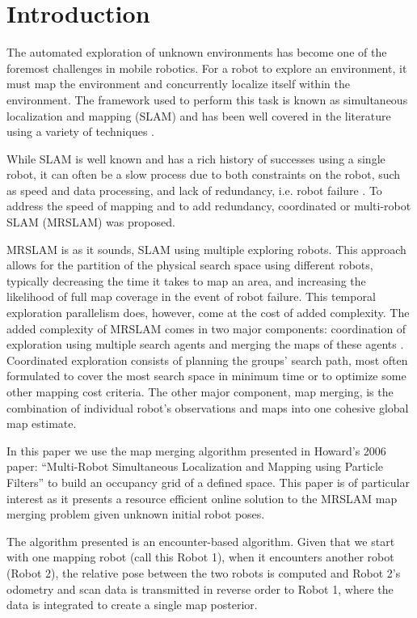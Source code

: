 \section{Introduction}
\label{S:Intro}


The automated exploration of unknown environments has become one of the foremost challenges in mobile robotics. For a robot to explore an environment, it must map the environment and concurrently localize itself within the environment.  The framework used to perform this task is known as simultaneous localization and mapping (SLAM) and has been well covered in the literature using a variety of techniques \cite{durrant2006simultaneous,bailey2006simultaneous}.

While SLAM is well known and has a rich history of successes using a single robot, it can often be a slow process due to both constraints on the robot, such as speed and data processing, and lack of redundancy, i.e. robot failure \cite{thrun2001probabilistic,burgard2005coordinated}.  To address the speed of mapping and to add redundancy, coordinated or multi-robot SLAM (MRSLAM) was proposed.

MRSLAM is as it sounds, SLAM using multiple exploring robots. This approach allows for the partition of the physical search space using different robots, typically decreasing the time it takes to map an area, and increasing the likelihood of full map coverage in the event of robot failure. This temporal exploration parallelism does, however, come at the cost of added complexity. The added complexity of MRSLAM comes in two major components: coordination of exploration using multiple search agents and merging the maps of these agents \cite{fox2006distributed}.  Coordinated exploration consists of planning the groups' search path, most often formulated to cover the most search space in minimum time or to optimize some other mapping cost criteria. The other major component, map merging, is the combination of individual robot's observations and maps into one cohesive global map estimate.

In this paper we use the map merging algorithm presented in Howard's 2006 paper: ``Multi-Robot Simultaneous Localization and Mapping using Particle Filters'' \cite{howard2006multi} to build an occupancy grid of a defined space. This paper is of particular interest as it presents a resource efficient online solution to the MRSLAM map merging problem given unknown initial robot poses.  

The algorithm presented is an encounter-based algorithm.  Given that we start with one mapping robot (call this Robot 1), when it encounters another robot (Robot 2), the relative pose between the two robots is computed and Robot 2's odometry and scan data is transmitted in reverse order to Robot 1, where the data is integrated to create a single map posterior.

